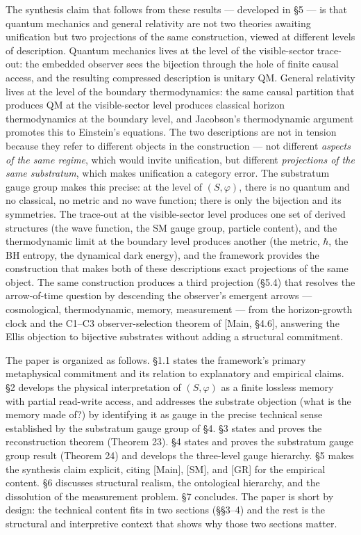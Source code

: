 \documentclass[
]{article}
\begin{document}
The synthesis claim that follows from these results --- developed in §5
--- is that quantum mechanics and general relativity are not two
theories awaiting unification but two projections of the same
construction, viewed at different levels of description. Quantum
mechanics lives at the level of the visible-sector trace-out: the
embedded observer sees the bijection through the hole of finite causal
access, and the resulting compressed description is unitary QM. General
relativity lives at the level of the boundary thermodynamics: the same
causal partition that produces QM at the visible-sector level produces
classical horizon thermodynamics at the boundary level, and Jacobson's
thermodynamic argument promotes this to Einstein's equations. The two
descriptions are not in tension because they refer to different objects
in the construction --- not different \emph{aspects of the same regime},
which would invite unification, but different \emph{projections of the
same substratum}, which makes unification a category error. The
substratum gauge group makes this precise: at the level of
\((S, \varphi)\), there is no quantum and no classical, no metric and no
wave function; there is only the bijection and its symmetries. The
trace-out at the visible-sector level produces one set of derived
structures (the wave function, the SM gauge group, particle content),
and the thermodynamic limit at the boundary level produces another (the
metric, \(\hbar\), the BH entropy, the dynamical dark energy), and the
framework provides the construction that makes both of these
descriptions exact projections of the same object. The same construction
produces a third projection (§5.4) that resolves the arrow-of-time
question by descending the observer's emergent arrows --- cosmological,
thermodynamic, memory, measurement --- from the horizon-growth clock and
the C1--C3 observer-selection theorem of {[}Main, §4.6{]}, answering the
Ellis objection to bijective substrates without adding a structural
commitment.

The paper is organized as follows. §1.1 states the framework's primary
metaphysical commitment and its relation to explanatory and empirical
claims. §2 develops the physical interpretation of \((S, \varphi)\) as a
finite lossless memory with partial read-write access, and addresses the
substrate objection (what is the memory made of?) by identifying it as
gauge in the precise technical sense established by the substratum gauge
group of §4. §3 states and proves the reconstruction theorem (Theorem
23). §4 states and proves the substratum gauge group result (Theorem 24)
and develops the three-level gauge hierarchy. §5 makes the synthesis
claim explicit, citing {[}Main{]}, {[}SM{]}, and {[}GR{]} for the
empirical content. §6 discusses structural realism, the ontological
hierarchy, and the dissolution of the measurement problem. §7 concludes.
The paper is short by design: the technical content fits in two sections
(§§3--4) and the rest is the structural and interpretive context that
shows why those two sections matter.
\end{document}
